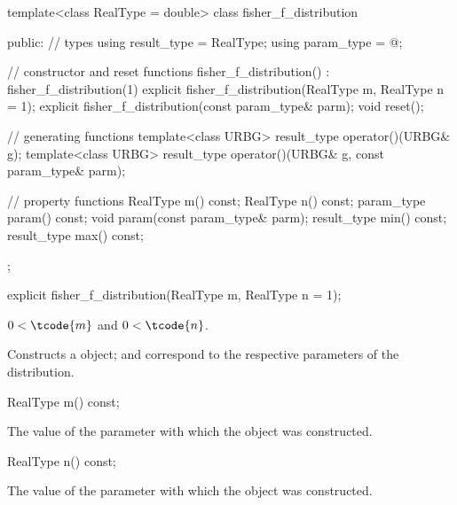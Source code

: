 %
\begin{codeblock}
template<class RealType = double>
  class fisher_f_distribution {
  public:
    // types
    using result_type = RealType;
    using param_type  = @\unspec@;

    // constructor and reset functions
    fisher_f_distribution() : fisher_f_distribution(1) {}
    explicit fisher_f_distribution(RealType m, RealType n = 1);
    explicit fisher_f_distribution(const param_type& parm);
    void reset();

    // generating functions
    template<class URBG>
      result_type operator()(URBG& g);
    template<class URBG>
      result_type operator()(URBG& g, const param_type& parm);

    // property functions
    RealType m() const;
    RealType n() const;
    param_type param() const;
    void param(const param_type& parm);
    result_type min() const;
    result_type max() const;
  };
\end{codeblock}


%
\begin{itemdecl}
explicit fisher_f_distribution(RealType m, RealType n = 1);
\end{itemdecl}

\begin{itemdescr}
\pnum
\requires $0 < \tcode{m}$ and $0 < \tcode{n}$.

\pnum
\effects Constructs a  object;
 and 
correspond to the respective parameters of the distribution.
\end{itemdescr}

%
\begin{itemdecl}
RealType m() const;
\end{itemdecl}

\begin{itemdescr}
\pnum\returns The value of the  parameter
 with which the object was constructed.
\end{itemdescr}

%
\begin{itemdecl}
RealType n() const;
\end{itemdecl}

\begin{itemdescr}
\pnum\returns The value of the  parameter
 with which the object was constructed.
\end{itemdescr}

